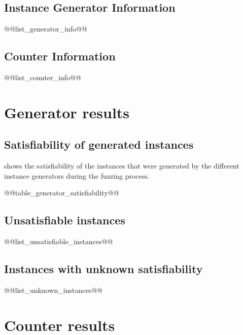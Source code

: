 \documentclass[british]{article}
\begin{document}
\subsection{Instance Generator Information}
\label{subsec:instance-generator-information}

@@list_generator_info@@

\subsection{Counter Information}
\label{subsec:counter-information}

@@list_counter_info@@

\section{Generator results}
\label{sec:generator-results}


\subsection{Satisfiability of generated instances}
 shows the satisfiability of the instances that were generated by the different instance generators during the fuzzing process.

\begin{table}[ht]
    \begin{center}
    \caption{Satisfiability of instances generated during fuzzing.}
    \label{tab:generator-satisfiability}
@@table_generator_satisfiability@@
    \end{center}
\end{table}

\subsection{Unsatisfiable instances}
\label{subsec:unsatisfiable-instances}

@@list_unsatisfiable_instances@@


\subsection{Instances with unknown satisfiability}
\label{subsec:unknown-instances}

@@list_unknown_instances@@


\section{Counter results}
\label{sec:counter-results}
\end{document}
